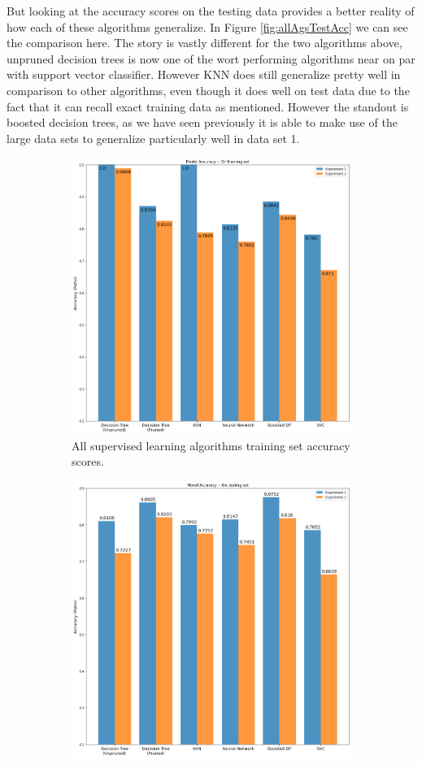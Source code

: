 \documentclass[
	letterpaper, %
]{IEEEtran}
\begin{document}
	But looking at the accuracy scores on the testing data provides a better reality of how each of these algorithms generalize. In Figure \ref{fig:allAgsTestAcc} we can see the comparison here. The story is vastly different for the two algorithms above, unpruned decision trees is now one of the wort performing algorithms near on par with support vector classifier. However KNN does still generalize pretty well in comparison to other algorithms, even though it does well on test data due to the fact that it can recall exact training data as mentioned. However the standout is boosted decision trees, as we have seen previously it is able to make use of the large data sets to generalize particularly well in data set 1.
	\begin{figure}[h]
		\begin{subfigure}{.5\textwidth}
			\centering
			\includegraphics[width=.8\linewidth]{./images/allModelsTrainingAcc.png}
			\caption{All supervised learning algorithms training set accuracy scores.}
			\label{fig:allAgsTrainAcc}
		\end{subfigure}
		\begin{subfigure}{.5\textwidth}
			\centering
			\includegraphics[width=.8\linewidth]{./images/allModelsTestAcc.png}

\end{subfigure}
\end{figure}
\end{document}
